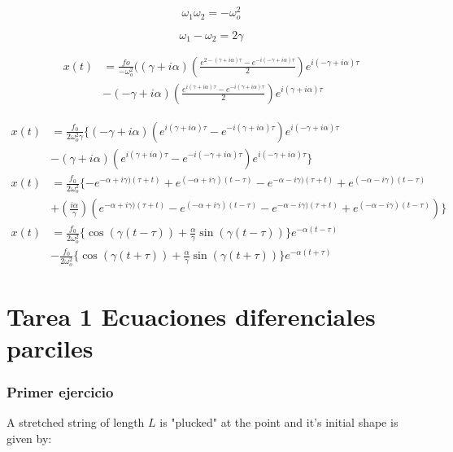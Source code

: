 \documentclass[11pt]{report}
\theoremstyle{plain}
\theoremstyle{definition}
\begin{document}
\begin{equation*}
	\omega_1\omega_2 = -\omega^2_o
\end{equation*}

\begin{equation*}
	\omega_1-\omega_2 = 2\gamma
\end{equation*}

\begin{align*}
	x(t)&=\frac{fo}{-\omega^2_o} ((\gamma +i\alpha)(\frac{e^{2-(\gamma+i\alpha)\tau}-e^{-i(-\gamma+i\alpha)\tau}}{2}) e^{i(-\gamma+i\alpha)\tau}\\
	&-(-\gamma +i\alpha)(\frac{e^{i(\gamma+i\alpha)\tau}-e^{-i(\gamma+i\alpha)\tau}}{2}) e^{i(\gamma+i\alpha)\tau}
\end{align*}

\begin{align*}
	x(t)&= \frac{f_0}{2\omega_o^2\gamma} \lbrace (-\gamma +i\alpha) (e^{i(\gamma+i\alpha)\tau} - e^{-i(\gamma +i\alpha)\tau}) e^{i(-\gamma+i\alpha)\tau}\\ 
	&- (\gamma +i\alpha) (e^{i(\gamma+i\alpha)\tau} - e^{-i(-\gamma +i\alpha)\tau}) e^{i(-\gamma+i\alpha)\tau}\rbrace\\
	x(t)&= \frac{f_0}{2\omega_o^2}\lbrace -e^{-\alpha+i\gamma)(\tau+t)}+e^{(-\alpha+i\gamma)(t-\tau)}-e^{-\alpha-i\gamma)(\tau+t)}+e^{(-\alpha-i\gamma)(t-\tau)}\\
	&+(\frac{i\alpha}{\gamma})(e^{-\alpha+i\gamma)(\tau+t)}-e^{(-\alpha+i\gamma)(t-\tau)}-e^{-\alpha-i\gamma)(\tau+t)}+e^{(-\alpha-i\gamma)(t-\tau)})\rbrace\\
	x(t)&= \frac{f_0}{2\omega_o^2}\lbrace\cos(\gamma(t-\tau))+\frac{\alpha}{\gamma}\sin(\gamma(t-\tau))\rbrace e^{-\alpha(t-\tau)}\\
	&- \frac{f_0}{2\omega_o^2}\lbrace\cos(\gamma(t+\tau))+\frac{\alpha}{\gamma} \sin(\gamma(t+\tau))\rbrace e^{-\alpha(t+\tau)}
\end{align*}

\part{Tarea 1 Ecuaciones diferenciales parciles}
\section{Primer ejercicio}
A stretched string of length $L$ is "plucked" at the point and it's initial shape is given by:\\
\end{document}
